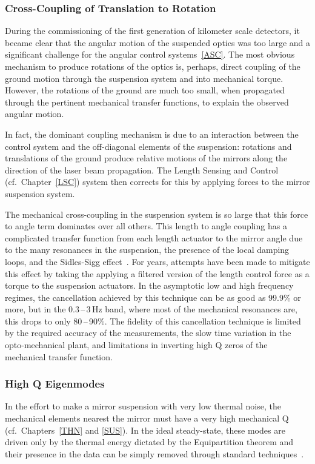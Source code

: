 \subsubsection{Cross-Coupling of Translation to Rotation}
During the commissioning of the first generation of kilometer scale detectors, it became clear that the angular motion of the suspended optics was too large and a significant challenge for the angular control systems~\ref{ASC}. The most obvious mechanism to produce rotations of the optics is, perhaps, direct coupling of the ground motion through the suspension system and into mechanical torque. However, the rotations of the ground are much too small, when propagated through the pertinent mechanical transfer functions, to explain the observed angular motion.

In fact, the dominant coupling mechanism is due to an interaction between the control system and the off-diagonal elements of the suspension: rotations and translations of the ground produce relative motions of the mirrors along the direction of the laser beam propagation. The Length Sensing and Control (cf.~Chapter~\ref{LSC}) system then corrects for this by applying forces to the mirror suspension system.

The mechanical cross-coupling in the suspension system is so large that this force to angle term dominates over all others. This length to angle coupling has a complicated transfer function from each length actuator to the mirror angle due to the many resonances in the suspension, the presence of the local damping loops, and the Sidles-Sigg effect~\cite{Sidles:2006un, Hirose:10, Dooley:13}. For years, attempts have been made to mitigate this effect by taking the applying a filtered version of the length control force as a torque to the suspension actuators. In the asymptotic low and high frequency regimes, the cancellation achieved by this technique can be as good as 99.9\% or more,
but in the 0.3\,--\,3\,Hz band, where most of the mechanical resonances are,
this drops to only 80\,--\,90\%. The fidelity of this cancellation technique is limited by the required accuracy of the measurements, the slow time variation in the opto-mechanical plant, and limitations in inverting high Q zeros of the mechanical transfer function.


\subsubsection{High Q Eigenmodes}
In the effort to make a mirror suspension with very low thermal noise, the mechanical
elements nearest the mirror must have a very high mechanical Q
(cf.~Chapters~\ref{THN} and \ref{SUS}).
In the ideal steady-state, these modes are driven only by the thermal energy
dictated by the Equipartition theorem and their presence in the data can be simply
removed through standard techniques~\cite{Allen:1999wy, Finn:Violins, Searle:2003ib, Sintes:1998gq}.

